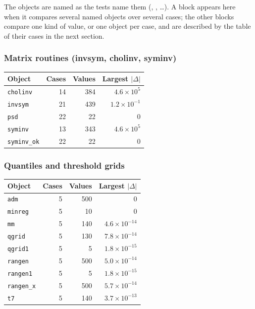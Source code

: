 \documentclass[
  10.5pt,
  a4paper,
]{article}
\begin{document}
The objects are named as the tests name them (, , \ldots). A block appears here when it compares several named objects over several cases; the other blocks compare one kind of value, or one object per case, and are described by the table of their cases in the next section.

\subsubsection*{Matrix routines (invsym, cholinv, syminv)}

\begin{longtable}{@{}p{8.2cm}rrr@{}}
\toprule
Object & Cases & Values & Largest $|\Delta|$ \\
\midrule
\endhead
\texttt{cholinv} & 14 & 384 & $4.6\times10^{5}$ \\
\texttt{invsym} & 21 & 439 & $1.2\times10^{-1}$ \\
\texttt{psd} & 22 & 22 & 0 \\
\texttt{syminv} & 13 & 343 & $4.6\times10^{5}$ \\
\texttt{syminv\_\allowbreak{}ok} & 22 & 22 & 0 \\
\bottomrule
\end{longtable}

\subsubsection*{Quantiles and threshold grids}

\begin{longtable}{@{}p{8.2cm}rrr@{}}
\toprule
Object & Cases & Values & Largest $|\Delta|$ \\
\midrule
\endhead
\texttt{adm} & 5 & 500 & 0 \\
\texttt{minreg} & 5 & 10 & 0 \\
\texttt{mm} & 5 & 140 & $4.6\times10^{-14}$ \\
\texttt{qgrid} & 5 & 130 & $7.8\times10^{-14}$ \\
\texttt{qgrid1} & 5 & 5 & $1.8\times10^{-15}$ \\
\texttt{rangen} & 5 & 500 & $5.0\times10^{-14}$ \\
\texttt{rangen1} & 5 & 5 & $1.8\times10^{-15}$ \\
\texttt{rangen\_\allowbreak{}x} & 5 & 500 & $5.7\times10^{-14}$ \\
\texttt{t7} & 5 & 140 & $3.7\times10^{-13}$ \\
\bottomrule
\end{longtable}
\end{document}
